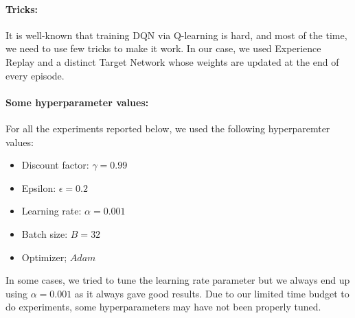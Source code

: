 \documentclass{article} %
\begin{document}
	\paragraph{Tricks:}
	
	It is well-known that training DQN via Q-learning is hard, and most of the time, we need to use few tricks to make it work. In our case, we used Experience Replay and a distinct Target Network whose weights are updated at the end of every episode.
	
	\paragraph{Some hyperparameter values:}
	
	For all the experiments reported below, we used the following hyperparemter values: 
	
	\begin{itemize}
		\item Discount factor: $\gamma = 0.99$
		\item Epsilon: $\epsilon = 0.2$
		\item Learning rate: $\alpha = 0.001$
		\item Batch size: $B = 32$
		\item Optimizer; $Adam$
	\end{itemize}
	
	In some cases, we tried to tune the learning rate parameter but we always end up using $\alpha = 0.001$ as it always gave good results. Due to our limited time budget to do experiments, some hyperparameters may have not been properly tuned.
	
\end{document}
